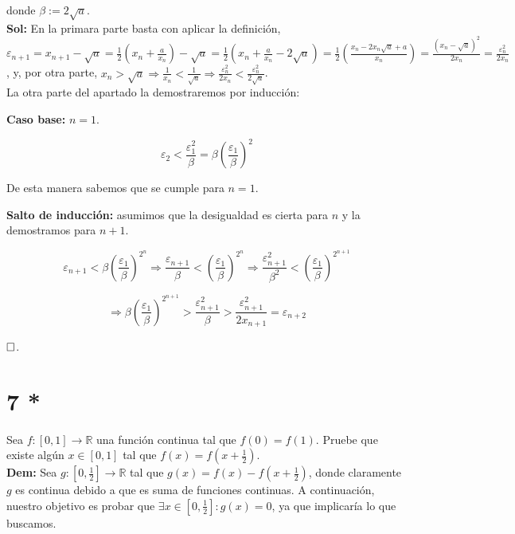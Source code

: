 \documentclass{article}
\begin{document}
donde $\beta := 2\sqrt{a}$. \\

\textbf{Sol:} En la primara parte basta con aplicar la definición, $\varepsilon_{n + 1} = x_{n + 1} - \sqrt{a} = \frac{1}{2}\left(x_n + \frac{a}{x_n}\right) - \sqrt{a} = \frac{1}{2}\left(x_n + \frac{a}{x_n} - 2\sqrt{a}\right) = \frac{1}{2}\left(\frac{x_n - 2x_n\sqrt{a} + a}{x_n}\right) = \frac{(x_n - \sqrt{a})^2}{2x_n} = \frac{\varepsilon_n^2}{2x_n}$, y, por otra parte, $x_n > \sqrt{a} \Longrightarrow \frac{1}{x_n} < \frac{1}{\sqrt{a}} \Longrightarrow \frac{\varepsilon_n^2}{2x_n} < \frac{\varepsilon_n^2}{2\sqrt{a}}$. \\

La otra parte del apartado la demostraremos por inducción:

\textbf{Caso base:} $n = 1$.

\[\varepsilon_2 < \frac{\varepsilon_1^2}{\beta} = \beta\left(\frac{\varepsilon_1}{\beta}\right)^2\]

De esta manera sabemos que se cumple para $n = 1$.

\textbf{Salto de inducción:} asumimos que la desigualdad es cierta para $n$ y la demostramos para $n + 1$.

\[\varepsilon_{n + 1} < \beta\left(\frac{\varepsilon_1}{\beta}\right)^{2^n} \Longrightarrow \frac{\varepsilon_{n + 1}}{\beta} < \left(\frac{\varepsilon_1}{\beta}\right)^{2^n} \Longrightarrow \frac{\varepsilon_{n + 1}^2}{\beta^2} < \left(\frac{\varepsilon_1}{\beta}\right)^{2^{n + 1}}\]

\[\Longrightarrow \beta\left(\frac{\varepsilon_1}{\beta}\right)^{2^{n + 1}} > \frac{\varepsilon_{n + 1}^2}{\beta} > \frac{\varepsilon_{n + 1}^2}{2x_{n + 1}} = \varepsilon_{n + 2}\]

$\hfill\square$.

\section{7 *}

Sea $f : [0, 1] \longrightarrow \mathbb{R}$ una función continua tal que $f(0) = f(1)$. Pruebe que existe algún $x \in [0, 1]$ tal que $f(x) = f(x + \frac{1}{2})$. \\

\textbf{Dem:} Sea $g : [0, \frac{1}{2}] \longrightarrow \mathbb{R}$ tal que $g(x) = f(x) - f(x + \frac{1}{2})$, donde claramente $g$ es continua debido a que es suma de funciones continuas. A continuación, nuestro objetivo es probar que $\exists x \in [0, \frac{1}{2}]: g(x) = 0$, ya que implicaría lo que buscamos.
\end{document}
